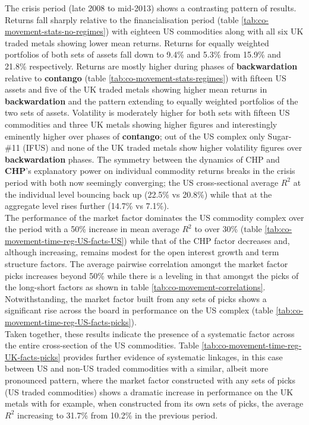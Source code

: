 \documentclass[]{elsarticle} %
\begin{document}
The crisis period (late 2008 to mid-2013) shows a contrasting pattern of results. Returns fall sharply relative to the financialisation period (table \ref{tab:co-movement-stats-no-regimes}) with eighteen US commodities along with all six UK traded metals showing lower mean returns. Returns for equally weighted portfolios of both sets of assets fall down to 9.4\% and 5.3\% from 15.9\% and 21.8\% respectively. Returns are mostly higher during phases of \textbf{backwardation} relative to \textbf{contango} (table \ref{tab:co-movement-stats-regimes}) with fifteen US assets and five of the UK traded metals showing higher mean returns in \textbf{backwardation} and the pattern extending to equally weighted portfolios of the two sets of assets. Volatility is moderately higher for both sets with fifteen US commodities and three UK metals showing higher figures and interestingly eminently higher over phases of \textbf{contango}; out of the US complex only Sugar-\#11 (IFUS) and none of the UK traded metals show higher volatility figures over \textbf{backwardation} phases. The symmetry between the dynamics of CHP and \textbf{CHP}'s explanatory power on individual commodity returns breaks in the crisis period with both now seemingly converging; the US cross-sectional average \(R^{2}\) at the individual level bouncing back up (22.5\% vs 20.8\%) while that at the aggregate level rises further (14.7\% vs 7.1\%).\\
The performance of the market factor dominates the US commodity complex over the period with a 50\% increase in mean average \(R^{2}\) to over 30\% (table \ref{tab:co-movement-time-reg-US-facts-US}) while that of the CHP factor decreases and, although increasing, remains modest for the open interest growth and term structure factors. The average pairwise correlation amongst the market factor picks increases beyond 50\% while there is a leveling in that amongst the picks of the long-short factors as shown in table \ref{tab:co-movement-correlations}. Notwithstanding, the market factor built from any sets of picks shows a significant rise across the board in performance on the US complex (table \ref{tab:co-movement-time-reg-US-facts-picks}).\\
Taken together, these results indicate the presence of a systematic factor across the entire cross-section of the US commodities. Table \ref{tab:co-movement-time-reg-UK-facts-picks} provides further evidence of systematic linkages, in this case between US and non-US traded commodities with a similar, albeit more pronounced pattern, where the market factor constructed with any sets of picks (US traded commodities) shows a dramatic increase in performance on the UK metals with for example, when constructed from its own sets of picks, the average \(R^{2}\) increasing to 31.7\% from 10.2\% in the previous period.
\end{document}
